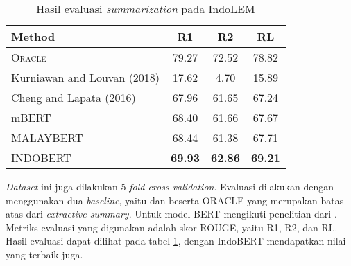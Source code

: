 \begin{table}[h]
    \vspace{0.25cm}
    \centering
    \caption{Hasil evaluasi \textit{summarization} pada IndoLEM}
    \label{table:indolem-summarization-result}
    \begin{tabular}{lccc}
        \toprule
        \textbf{Method} & \textbf{R1} & \textbf{R2} & \textbf{RL} \\
        \midrule
        \textsc{Oracle} & 79.27 & 72.52 & 78.82 \\
        Kurniawan and Louvan (2018) & 17.62 & 4.70 & 15.89 \\
        Cheng and Lapata (2016) & 67.96 & 61.65 & 67.24 \\
        mBERT & 68.40 & 61.66 & 67.67 \\
        MALAYBERT & 68.44 & 61.38 & 67.71 \\
        INDOBERT & \textbf{69.93} & \textbf{62.86} & \textbf{69.21} \\
        \bottomrule
    \end{tabular}
\end{table}

\textit{Dataset} ini juga dilakukan 5-\textit{fold cross validation}. Evaluasi dilakukan dengan menggunakan dua \textit{baseline}, yaitu \citeauthor{summarization} dan \citeauthor{summarization_lstm} beserta ORACLE yang merupakan batas atas dari \textit{extractive summary}. Untuk model BERT mengikuti penelitian dari \citeauthor{summarization_bert} \parencite{indolem}. Metriks evaluasi yang digunakan adalah skor ROUGE, yaitu R1, R2, dan RL. Hasil evaluasi dapat dilihat pada tabel \ref{table:indolem-summarization-result}, dengan IndoBERT mendapatkan nilai yang terbaik juga.
